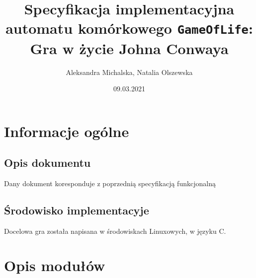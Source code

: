 \documentclass{article}
\title{Specyfikacja implementacyjna automatu kom\'orkowego \texttt{GameOfLife}:
	Gra w \.zycie Johna Conwaya}
\author{Aleksandra Michalska, Natalia Olszewska}
\date{09.03.2021}
\begin{document}
\begin{titlepage}
	\maketitle
\end{titlepage}

\section{Informacje og\'olne}

\subsection{Opis dokumentu}

\quad Dany dokument koresponduje z poprzedni\k{a} specyfikacj\k{a} funkcjonaln\k{a}

\subsection{\'Srodowisko implementacyje}
\quad Docelowa gra zosta\l{}a napisana w \'srodowiskach Linuxowych, w j\k{e}zyku C. 


\section{Opis modu\l{}\'ow}
\end{document}
